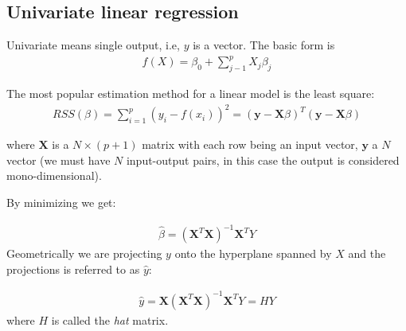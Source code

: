 \documentclass[12pt, letterpaper]{article}
\theoremstyle{definition}
\newcommand{\X}{\mathrm{\mathbf{X}}}
\begin{document}
\subsection{Univariate linear regression}
	Univariate means single output, i.e, $y$ is a vector. The basic form is 
\begin{align}
f(X) = \beta_0 + \sum_{j-1}^p X_j \beta_j
\end{align}

The most popular estimation method for a linear model is the least square:
\begin{align}
RSS(\beta) = \sum_{i=1}^{p}  \left( y_i - f(x_i) \right)^2 = \left(\bm{y} - \bm{X}\beta\right)^T \left(\bm{y} - \bm{X}\beta\right)
\end{align}

where $\bm{X}$ is a $N \times (p+1)$ matrix with each row being an input vector, $\bm{y}$ a $N$ vector (we must have $N$ input-output pairs, in this case the output is considered mono-dimensional).

By minimizing we get:

\begin{align}
\hat{\beta} = \left( \X^T \X\right)^{-1} \X^TY
\end{align}
Geometrically we are projecting $y$ onto the hyperplane spanned by $X$ and the projections is referred to as $\hat{y}$:

\begin{align}
\hat{y} =\X \left( \X^T \X\right)^{-1} \X^T Y = H Y
\end{align}
where $H$ is called the \textit{hat} matrix.


\end{document}
